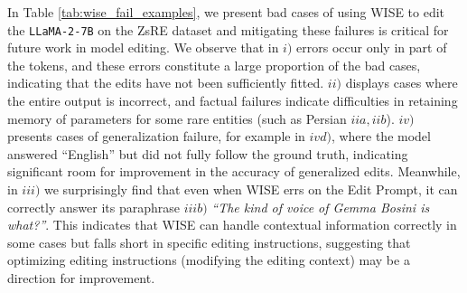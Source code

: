 \documentclass{article}
\begin{document}



In Table \ref{tab:wise_fail_examples}, we present bad cases of using WISE to edit the \texttt{LLaMA-2-7B} on the ZsRE dataset and mitigating these failures is critical for future work in model editing.
We observe that in $i)$ errors occur only in part of the tokens, and these errors constitute a large proportion of the bad cases, indicating that the edits have not been sufficiently fitted.
$ii)$ displays cases where the entire output is incorrect, and factual failures indicate difficulties in retaining memory of parameters for some rare entities (such as Persian $iia, iib$).
$iv)$ presents cases of generalization failure, for example in $ivd)$, where the model answered ``English'' but did not fully follow the ground truth, indicating significant room for improvement in the accuracy of generalized edits.
Meanwhile, in $iii)$ we surprisingly find that even when WISE errs on the Edit Prompt, it can correctly answer its paraphrase $iii b)$ \textit{``The kind of voice of Gemma Bosini is what?''}.
This indicates that WISE can handle contextual information correctly in some cases but falls short in specific editing instructions, suggesting that optimizing editing instructions (modifying the editing context) may be a direction for improvement.
\end{document}
